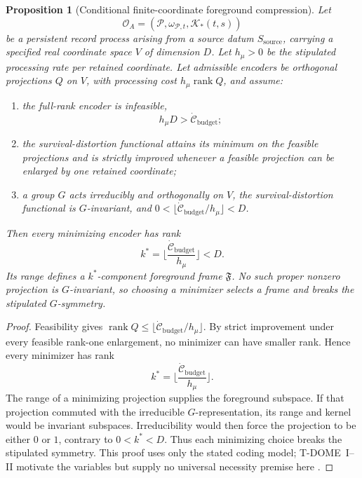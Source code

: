 \documentclass[12pt]{article}
\newtheorem{proposition}[theorem]{Proposition}
\theoremstyle{definition}
\theoremstyle{remark}
\begin{document}
\begin{proposition}[Conditional finite-coordinate foreground compression]\label{prop:budget}
Let
\[
\mathcal O_A=(\mathcal P,\omega_{\mathcal P,t},\mathcal K_*(t,s))
\]
be a persistent record process arising from a source datum
\(S_{\mathrm{source}}\), carrying a specified real coordinate space
\(V\) of dimension \(D\). Let \(h_\mu>0\) be the stipulated processing
rate per retained coordinate. Let admissible encoders be orthogonal
projections \(Q\) on \(V\), with processing cost
\(h_\mu\operatorname{rank}Q\), and assume:
\begin{enumerate}
\item the full-rank encoder is infeasible,
  \[
  h_\mu D>\dot{\mathcal C}_{\mathrm{budget}};
  \]
\item the survival-distortion functional attains its minimum on the
  feasible projections and is strictly improved whenever a feasible
  projection can be enlarged by one retained coordinate;
\item a group \(G\) acts irreducibly and orthogonally on \(V\), the
  survival-distortion functional is \(G\)-invariant, and
  \(0<\lfloor\dot{\mathcal C}_{\mathrm{budget}}/h_\mu\rfloor<D\).
\end{enumerate}
Then every minimizing encoder has rank
\[
k^*
=
\Big\lfloor
\frac{\dot{\mathcal C}_{\mathrm{budget}}}{h_\mu}
\Big\rfloor
<D.
\]
Its range defines a \(k^*\)-component foreground frame \(\mathfrak F\).
No such proper nonzero projection is \(G\)-invariant, so choosing a
minimizer selects a frame and breaks the stipulated \(G\)-symmetry.
\end{proposition}

\begin{proof}
Feasibility gives
\(\operatorname{rank}Q\le
\lfloor\dot{\mathcal C}_{\mathrm{budget}}/h_\mu\rfloor\).
By strict improvement under every feasible rank-one enlargement, no
minimizer can have smaller rank. Hence every minimizer has rank
\[
k^*
=
\Big\lfloor
\frac{\dot{\mathcal C}_{\mathrm{budget}}}{h_\mu}
\Big\rfloor.
\]
The range of a minimizing projection supplies the foreground subspace.
If that projection commuted with the irreducible \(G\)-representation,
its range and kernel would be invariant subspaces. Irreducibility would
then force the projection to be either \(0\) or \(1\), contrary to
\(0<k^*<D\). Thus each minimizing choice breaks the stipulated symmetry.
This proof uses only the stated coding model; T-DOME~I--II motivate the
variables but supply no universal necessity premise here
\cite{TDOMEI,TDOMEII}.
\end{proof}
\end{document}
